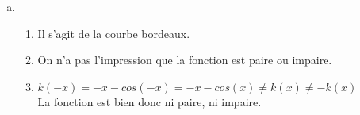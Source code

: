 \documentclass[12pt, a4paper]{article}
\begin{document}
\begin{Exercise}[number={80}]
\begin{enumerate}[a)]
\begin{enumerate}[1)]
                \end{enumerate}\smallbreak
        \item   \begin{enumerate}[1)]
                    \item Il s'agit de la courbe bordeaux.
                    \item On n'a pas l'impression que la fonction est paire ou impaire.
                    \item $k(-x)=-x-cos(-x)=-x-cos(x)\neq k(x)\neq -k(x)$ \\ La fonction est bien donc ni paire, ni impaire.
                \end{enumerate}
    \end{enumerate}
\end{Exercise}

\pagebreak
\end{document}
